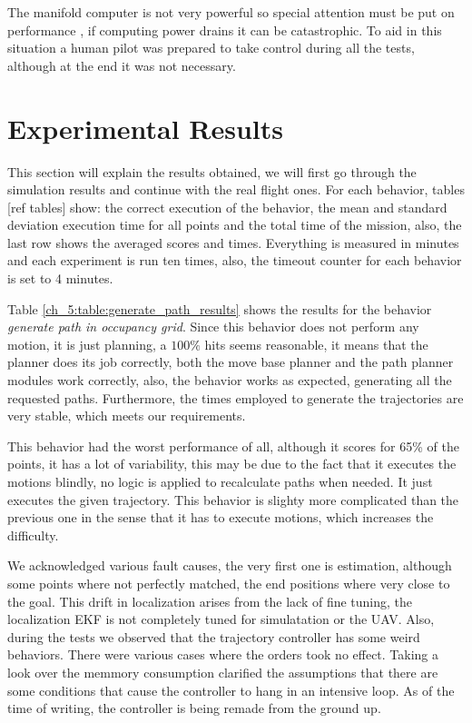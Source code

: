     The manifold computer is not very powerful so special attention must be put on performance , if computing power drains it can be catastrophic. To aid in this situation a human pilot was prepared to take control during all the tests, although at the end it was not necessary.

\section{Experimental Results} \label{ch_5:sect:results}

  This section will explain the results obtained, we will first go through the simulation results and continue with the real flight ones. For each behavior, tables [ref tables] show: the correct execution of the behavior, the mean and standard deviation execution time for all points and the total time of the mission, also, the last row shows the averaged scores and times. Everything is measured in minutes and each experiment is run ten times, also, the timeout counter for each behavior is set to 4 minutes.
 
  

  Table \ref{ch_5:table:generate_path_results} shows the results for the behavior \textit{generate path in occupancy grid}. Since this behavior does not perform any motion, it is just planning, a $100\%$ hits seems reasonable, it means that the planner does its job correctly, both the move base planner and the path planner modules work correctly, also, the behavior works as expected, generating all the requested paths. Furthermore, the times employed to generate the trajectories are very stable, which meets our requirements. 

  

  This behavior had the worst performance of all, although it scores for 65\% of the points, it has a lot of variability, this may be due to the fact that it executes the motions blindly, no logic is applied to recalculate paths when needed. It just executes the given trajectory. This behavior is slighty more complicated than the previous one in the sense that it has to execute motions, which increases the difficulty.

  We acknowledged various fault causes, the very first one is estimation, although some points where not perfectly matched, the end positions where very close to the goal. This drift in localization arises from the lack of fine tuning, the localization EKF is not completely tuned for simulatation or the UAV. Also, during the tests we observed that the trajectory controller has some weird behaviors. There were various cases where the orders took no effect. Taking a look over the memmory consumption clarified the assumptions that there are some conditions that cause the controller to hang in an intensive loop. As of the time of writing, the controller is being remade from the ground up.

